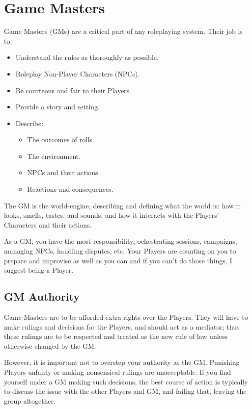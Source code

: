 \documentclass[../main.tex]{subfiles}
\begin{document}
    \section{Game Masters}

    Game Masters (GMs) are a critical part of any roleplaying system. Their job is to:

    \begin{itemize}
        \item Understand the rules as thoroughly as possible.
        \item Roleplay Non-Player Characters (NPCs).
        \item Be courteous and fair to their Players.
        \item Provide a story and setting.
        \item Describe:
        \begin{itemize}
            \item The outcomes of rolls.
            \item The environment.
            \item NPCs and their actions.
            \item Reactions and consequences.
        \end{itemize}
    \end{itemize}
    
    The GM is the world-engine, describing and defining what the world is: how it looks, smells, tastes, and sounds, and how it interacts with the Players' Characters and their actions.
    
    As a GM, you have the most responsibility; ochestrating sessions, campaigns, managing NPCs, handling disputes, etc. Your Players are counting on you to prepare and improvise as well as you can and if you can't do those things, I suggest being a Player.
    
    \subsection{GM Authority}
    Game Masters are to be afforded extra rights over the Players. They will have to make rulings and decisions for the Players, and should act as a mediator; thus these rulings are to be respected and treated as the new rule of law unless otherwise changed by the GM.

    However, it is important not to overstep your authority as the GM. Punishing Players unfairly or making nonsensical rulings are unacceptable. If you find yourself under a GM making such decisions, the best course of action is typically to discuss the issue with the other Players and GM, and failing that, leaving the group altogether.
\end{document}
